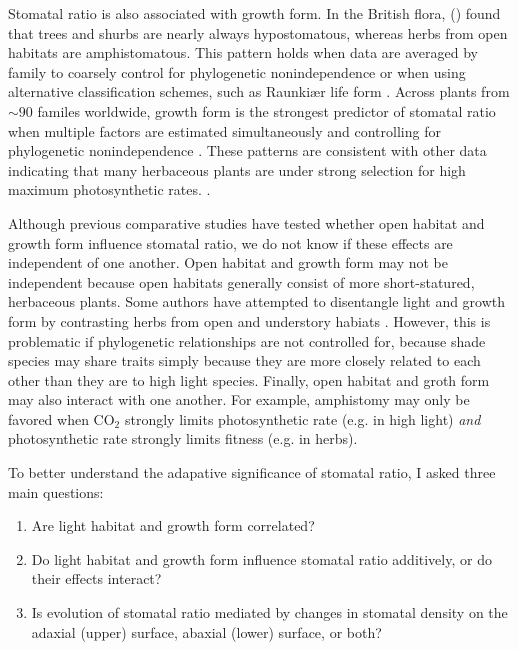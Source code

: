 \documentclass[12pt, oneside]{article}
\begin{document}
Stomatal ratio is also associated with growth form. In the British flora, \citeauthor{Salisbury_1927} (\citeyear{Salisbury_1927}) found that trees and shurbs are nearly always hypostomatous, whereas herbs from open habitats are amphistomatous. This pattern holds when data are averaged by family to coarsely control for phylogenetic nonindependence \citep{Peat_Fitter_1994b} or when using alternative classification schemes, such as Raunki\ae r life form \citep{Peat_Fitter_1994b}. Across plants from $\sim 90$ familes worldwide, growth form is the strongest predictor of stomatal ratio when multiple factors are estimated simultaneously and controlling for phylogenetic nonindependence \citep{Muir_2015}. These patterns are consistent with other data indicating that many herbaceous plants are under strong selection for high maximum photosynthetic rates. \citep{Bazzaz_1979, Korner_etal_1989, Wullschleger_1993}.

Although previous comparative studies have tested whether open habitat and growth form influence stomatal ratio, we do not know if these effects are independent of one another. Open habitat and growth form may not be independent because open habitats generally consist of more short-statured, herbaceous plants. Some authors have attempted to disentangle light and growth form by contrasting herbs from open and understory habiats \citep{Salisbury_1927}. However, this is problematic if phylogenetic relationships are not controlled for, because shade species may share traits simply because they are more closely related to each other than they are to high light species. Finally, open habitat and groth form may also interact with one another. For example, amphistomy may only be favored when CO$_2$ strongly limits photosynthetic rate (e.g. in high light) \textit{and} photosynthetic rate strongly limits fitness (e.g. in herbs).

To better understand the adapative significance of stomatal ratio, I asked three main questions:

\begin{enumerate}

  \item{Are light habitat and growth form correlated?}
  \item{Do light habitat and growth form influence stomatal ratio additively, or do their effects interact?}
  \item{Is evolution of stomatal ratio mediated by changes in stomatal density on the adaxial (upper) surface, abaxial (lower) surface, or both?}
  
\end{enumerate}
\end{document}
